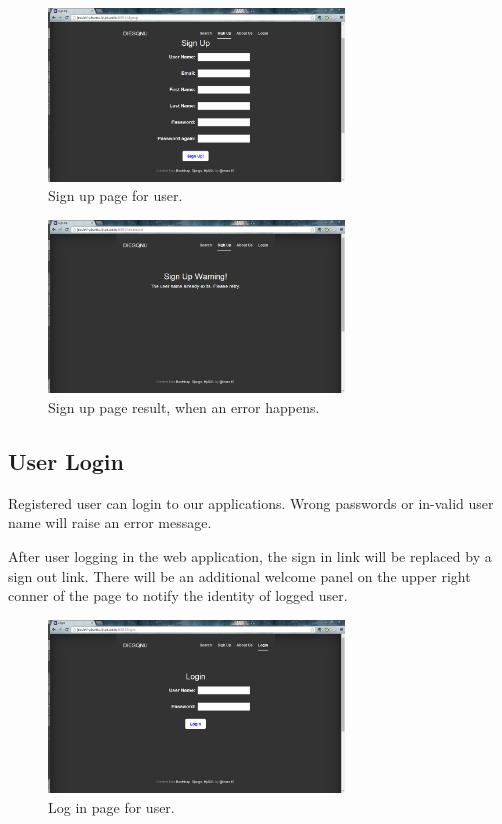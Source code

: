 \documentclass{article}
\begin{document}
\begin{figure}[h]
\centering
\includegraphics[width=0.7\textwidth]{fig/signup.png}
\caption{Sign up page for user.}
\end{figure}

\begin{figure}[h]
\centering
\includegraphics[width=0.7\textwidth]{fig/signup-error.PNG}
\caption{Sign up page result, when an error happens.}
\end{figure}


\subsection{User Login}
Registered user can login to our applications. Wrong passwords or in-valid user name will raise an error message.

After user logging in the web application, the sign in link will be replaced by a sign out link. There will be an additional welcome panel on the upper right conner of the page to notify the identity of logged user.

\begin{figure}[h]
\centering
\includegraphics[width=0.7\textwidth]{fig/login.PNG}
\caption{Log in page for user.}
\end{figure}
\end{document}
